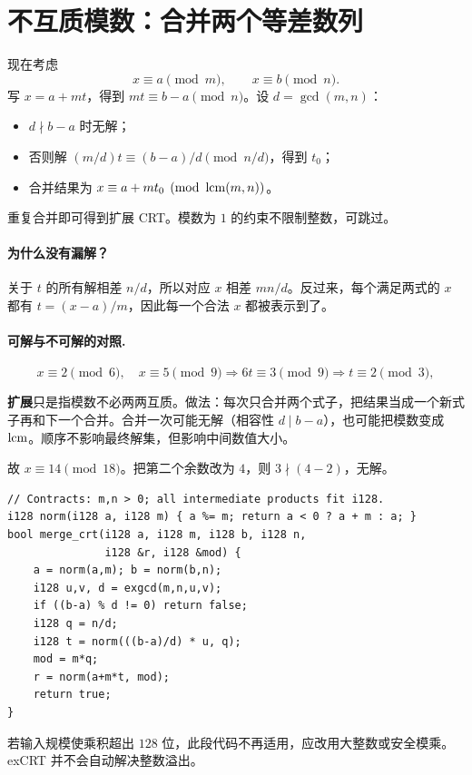 \section{不互质模数：合并两个等差数列}
现在考虑
\[
 x\equiv a\pmod m,\qquad x\equiv b\pmod n.
\]
写 $x=a+mt$，得到 $mt\equiv b-a\pmod n$。设 $d=\gcd(m,n)$：
\begin{itemize}
\item $d\nmid b-a$ 时无解；
\item 否则解 $(m/d)t\equiv(b-a)/d\pmod{n/d}$，得到 $t_0$；
\item 合并结果为 $x\equiv a+mt_0\pmod{\operatorname{lcm}(m,n)}$。
\end{itemize}
重复合并即可得到扩展 CRT。模数为 $1$ 的约束不限制整数，可跳过。


\paragraph{为什么没有漏解？}
关于 $t$ 的所有解相差 $n/d$，所以对应 $x$ 相差 $mn/d$。反过来，每个满足两式的 $x$ 都有 $t=(x-a)/m$，因此每一个合法 $x$ 都被表示到了。
\paragraph{可解与不可解的对照.}
\[
 x\equiv2\pmod6,\quad x\equiv5\pmod9
 \Longrightarrow 6t\equiv3\pmod9
 \Longrightarrow t\equiv2\pmod3,
\]

\begin{tip}
\textbf{扩展}只是指模数不必两两互质。做法：每次只合并两个式子，把结果当成一个新式子再和下一个合并。合并一次可能无解（相容性 $d\mid b-a$），也可能把模数变成 $\operatorname{lcm}$。顺序不影响最终解集，但影响中间数值大小。
\end{tip}

故 $x\equiv14\pmod{18}$。把第二个余数改为 $4$，则 $3\nmid(4-2)$，无解。

\begin{lstlisting}
// Contracts: m,n > 0; all intermediate products fit i128.
i128 norm(i128 a, i128 m) { a %= m; return a < 0 ? a + m : a; }
bool merge_crt(i128 a, i128 m, i128 b, i128 n,
               i128 &r, i128 &mod) {
    a = norm(a,m); b = norm(b,n);
    i128 u,v, d = exgcd(m,n,u,v);
    if ((b-a) % d != 0) return false;
    i128 q = n/d;
    i128 t = norm(((b-a)/d) * u, q);
    mod = m*q;
    r = norm(a+m*t, mod);
    return true;
}
\end{lstlisting}
若输入规模使乘积超出 $128$ 位，此段代码不再适用，应改用大整数或安全模乘。exCRT 并不会自动解决整数溢出。

